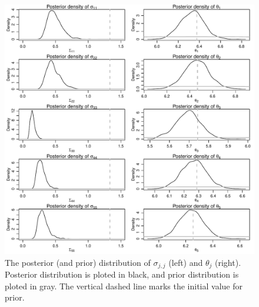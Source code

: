 \documentclass[12pt]{article}
\begin{document}
\begin{figure}[htbp]
	\centering
	\includegraphics[width=.9\textwidth]{pic/0.25/Posterior_vs_Prior.pdf}
	\caption{The posterior (and prior) distribution of $\sigma_{j, j}$ (left) and $\theta_j$ (right). Posterior distribution is ploted in black, and prior distribution is ploted in gray. The vertical dashed line marks the initial value for prior.}
	\label{fig:0.25-Posterior_vs_Prior}
\end{figure}

\newpage
\end{document}
